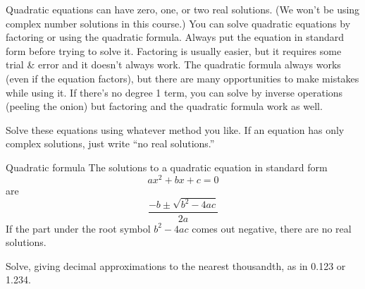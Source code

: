 
\begin{multicols}{2}

 Quadratic equations can have zero, one, or two real solutions.
 (We won't be using complex number solutions in this course.)
 You can solve quadratic equations by factoring or using the quadratic formula.
 Always put the equation in standard form before trying to solve it.
 Factoring is usually easier, but it requires some trial \& error and it doesn't always work.
 The quadratic formula always works (even if the equation factors), but there are many opportunities to make mistakes while using it.
 If there's no degree 1 term, you can solve by inverse operations (peeling the onion) but factoring and the quadratic formula work as well.

 Solve these equations using whatever method you like.
 If an equation has only complex solutions, just write ``no real solutions.''

 \columnbreak

 \begin{FormulaBox}{Quadratic formula}
  The solutions to a quadratic equation in standard form
  \begin{equation*}
   a x^2 + b x + c = 0
  \end{equation*}
  are
  \begin{equation*}
   \frac{
    -b \pm \sqrt{b^2 - 4 a c}
   }{
    2 a
   }
  \end{equation*}
  If the part under the root symbol $b^2 - 4ac$ comes out negative, there are no real solutions.
 \end{FormulaBox}
\end{multicols}

\begin{multicols}{2}
 \begin{ProblemSet}[pencil space=2.5in]
 \end{ProblemSet}
\end{multicols}

Solve, giving decimal approximations to the nearest thousandth, as in 0.123 or 1.234.

\begin{ProblemSet}[pencil space=3in]
\end{ProblemSet}

